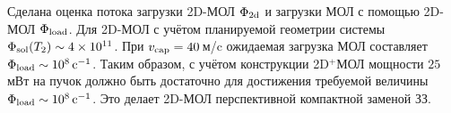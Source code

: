 
Сделана оценка потока загрузки 2D-МОЛ $\Phi_{\textnormal{2d}}$ и загрузки МОЛ с помощью 2D-МОЛ $\Phi_{\textnormal{load}}$. Для 2D-МОЛ с учётом планируемой геометрии системы $\Phi_{\textnormal{sol}}(T_2) \sim 4\times 10^{11}$. При $v_{\textnormal{cap}} = 40\,$м/c ожидаемая загрузка МОЛ составляет $\Phi_{\textnormal{load}} \sim 10^8\,\text{c}^{-1}$. Таким образом, с учётом конструкции 2D${}^+$МОЛ мощности $25\,$мВт на пучок должно быть достаточно для достижения требуемой величины $\Phi_{\textnormal{load}} \sim 10^8\,\text{c}^{-1}$. Это делает 2D-МОЛ перспективной компактной заменой ЗЗ.